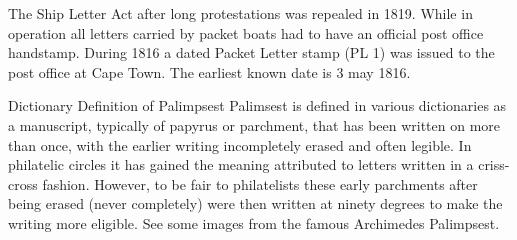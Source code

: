 The Ship Letter Act after long protestations was repealed in 1819. 
While in operation all letters 
carried by packet boats had to have an official post office handstamp. 
During 1816 a dated Packet Letter stamp (PL 1) 
was issued to the post office at Cape Town. The earliest known date is 3 may 1816. 


Dictionary Definition of Palimpsest
Palimsest is defined in various dictionaries as a manuscript, typically of papyrus or parchment, 
that has been written  on more than once, with the earlier writing incompletely erased and  
often legible. In philatelic circles it has gained the meaning attributed to 
letters written in a criss-cross fashion. However, to be fair to philatelists 
these early parchments after being erased (never completely) were then 
written at ninety degrees to make the writing 
more eligible. See some images from the famous Archimedes Palimpsest. 
                                